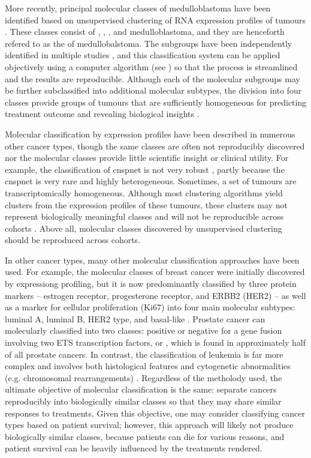 More recently, principal molecular classes of medulloblastoma have been identified based on unsupervised clustering of RNA expression profiles of tumours . These classes consist of , , , and  medulloblastoma, and they are henceforth refered to as the  of medullobalstoma. The subgroups have been independently identified in multiple studies , and this classification system can be applied objectively using a computer algorithm (see ) so that the process is streamlined and the results are reproducible. Although each of the molecular subgroups may be further subclassified into additional molecular subtypes, the division into four classes provide groups of tumours that are sufficiently homogeneous for predicting treatment outcome and revealing biological insights .

Molecular classification by expression profiles have been described in numerous other cancer types, though the same classes are often not reproducibly discovered nor the molecular classes provide little scientific insight or clinical utility. For example, the classification of \gls{cnspnet} is not very robust , partly because the \gls{cnspnet} is very rare and highly heterogeneous. Sometimes, a set of tumours are transcriptomically homogeneous. Although most clustering algorithms yield clusters from the expression profiles of these tumours, these clusters may not represent biologically meaningful classes and will not be reproducible across cohorts . Above all, molecular classes discovered by unsupervised clustering should be reproduced across cohorts.

In other cancer types, many other molecular classification approaches have been used. For example, the molecular classes of breast cancer were initially discovered by expressiong profiling, but it is now predominantly classified by three protein markers -- estrogen receptor, progesterone receptor, and ERBB2 (HER2) -- as well as a marker for cellular proliferation (Ki67) into four main molecular subtypes: luminal A, luminal B, HER2 type, and basal-like . Prostate cancer can molecularly classified into two classes: positive or negative for a gene fusion involving two ETS transcription factors,  or  , which is found in approximately half of all prostate cancers. In contrast, the classification of leukemia is far more complex and involves both histological features and cytogenetic abnormalities (e.g. chromosomal rearrangements) . Regardless of the metholody used, the ultimate objective of molecular classification is the same: separate cancers reproducibly into biologically similar classes so that they may share similar responses to treatments. Given this objective, one may consider classifying cancer types based on patient survival; however, this approach will likely not produce biologically similar classes, because patients can die for various reasons, and patient survival can be heavily influenced by the treatments rendered.

